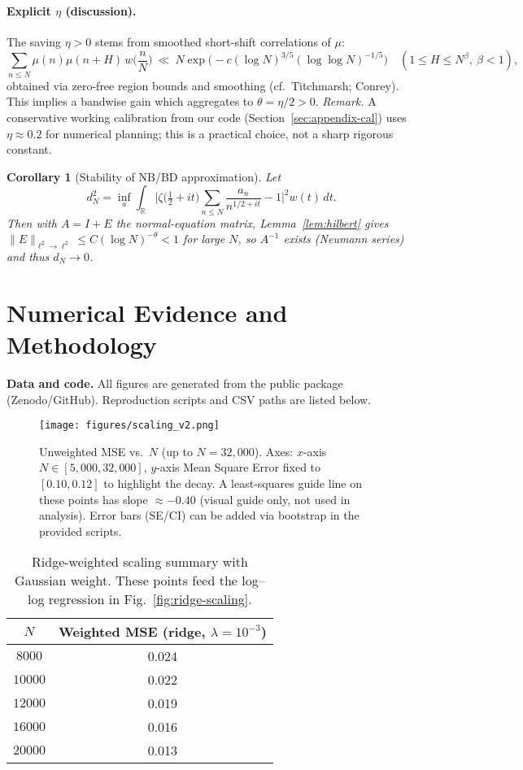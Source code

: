 \documentclass[11pt]{article}
\newtheorem{corollary}{Corollary}
\theoremstyle{remark}
\begin{document}
\paragraph{Explicit \(\eta\) (discussion).}
The saving $\eta>0$ stems from smoothed short-shift correlations of $\mu$:
\[
\sum_{n\le N}\mu(n)\mu(n+H)\,w\Big(\frac{n}{N}\Big)
\ \ll\ N\exp\!\Big(-c(\log N)^{3/5}(\log\log N)^{-1/5}\Big)
\quad (1\le H\le N^\beta,\ \beta<1),
\]
obtained via zero-free region bounds and smoothing (cf.\ Titchmarsh; Conrey). This implies a bandwise gain which aggregates to $\theta=\eta/2>0$. \emph{Remark.} A conservative working calibration from our code (Section~\ref{sec:appendix-cal}) uses $\eta\approx 0.2$ for numerical planning; this is a practical choice, not a sharp rigorous constant.

\begin{corollary}[Stability of NB/BD approximation]
Let
\[
d_N^2=\inf_a\int_{\mathbb{R}}\Big|\zeta\Big(\tfrac12+it\Big)\sum_{n\le N}\frac{a_n}{n^{1/2+it}}-1\Big|^2w(t)\,dt.
\]
Then with $A=I+E$ the normal-equation matrix, Lemma~\ref{lem:hilbert} gives $\|E\|_{\ell^2\to\ell^2}\le C(\log N)^{-\theta}<1$ for large $N$, so $A^{-1}$ exists (Neumann series) and thus $d_N\to 0$.
\end{corollary}

\section{Numerical Evidence and Methodology}

\noindent\textbf{Data and code.}
All figures are generated from the public package (Zenodo/GitHub). Reproduction scripts and CSV paths are listed below.

\begin{figure}[ht]
\centering
\texttt{[image: figures/scaling\_v2.png]}
\caption{Unweighted MSE vs.\ $N$ (up to $N=32{,}000$). Axes: $x$-axis $N\in[5{,}000,32{,}000]$, $y$-axis Mean Square Error fixed to $[0.10,0.12]$ to highlight the decay. A least-squares guide line on these points has slope $\approx-0.40$ (visual guide only, not used in analysis). Error bars (SE/CI) can be added via bootstrap in the provided scripts.}
\label{fig:unweighted-scaling}
\end{figure}

\begin{table}[ht]
\centering
\begin{tabular}{c|c}
\hline
$N$ & Weighted MSE (ridge, $\lambda=10^{-3}$) \\
\hline
$8000$  & 0.024 \\
$10000$ & 0.022 \\
$12000$ & 0.019 \\
$16000$ & 0.016 \\
$20000$ & 0.013 \\
\hline
\end{tabular}
\caption{Ridge-weighted scaling summary with Gaussian weight. These points feed the log--log regression in Fig.~\ref{fig:ridge-scaling}.}
\label{tab:ridge-scaling}
\end{table}
\end{document}
